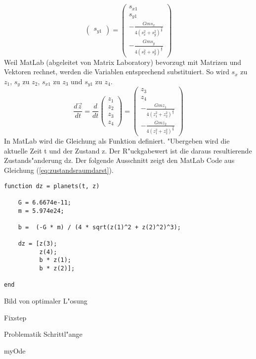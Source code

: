 \begin{refsection}
\begin{equation}
\begin{pmatrix}
s_{y1}
\end{pmatrix} = \begin{pmatrix}
s_{x1} \\ 
s_{y1}\\
-\frac{G m s_x}{4(s_x^2 + s_y^2)^\frac32} \\
-\frac{G m s_y}{4(s_x^2 + s_y^2)^\frac32}
\end{pmatrix}
\end{equation}
Weil MatLab (abgeleitet von Matrix Laboratory) bevorzugt mit Matrizen und Vektoren rechnet, werden die Variablen entsprechend substituiert. So wird $s_x$ zu $z_1$, $s_y$ zu $z_2$, $s_{x1}$ zu $z_3$ und $s_{y1}$ zu $z_4$.
\begin{equation}\label{eq:zustandsraumdarst}
\frac{d \vec{z}}{dt}=\frac{d}{dt} \begin{pmatrix}
z_1 \\ 
z_2 \\
z_3 \\
z_4
\end{pmatrix} = \begin{pmatrix}
z_3 \\ 
z_4 \\
-\frac{G m z_1}{4(z_1^2 + z_2^2)^\frac32} \\
-\frac{G m z_2}{4(z_1^2 + z_2^2)^\frac32}
\end{pmatrix}
\end{equation}
In MatLab wird die Gleichung als Funktion definiert.
"Ubergeben wird die aktuelle Zeit t und der Zustand z.
Der R"uckgabewert ist die daraus resultierende  Zustands"anderung dz.
Der folgende Ausschnitt zeigt den MatLab Code aus Gleichung (\ref{eq:zustandsraumdarst}).
\begin{lstlisting}[style=Matlab]
function dz = planets(t, z)

    G = 6.6674e-11;
    m = 5.974e24;

    b =  (-G * m) / (4 * sqrt(z(1)^2 + z(2)^2)^3);
    
    dz = [z(3);
          z(4);
          b * z(1);
          b * z(2)];
      
end
\end{lstlisting}

Bild von optimaler L"osung

Fixstep

Problematik Schrittl"ange

myOde








\end{refsection}

